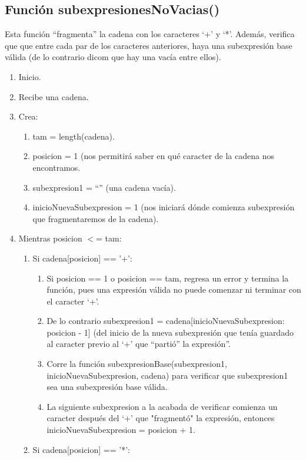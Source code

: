 \documentclass{article}
\begin{document}
\subsection{Función subexpresionesNoVacias()}
\normalsize Esta función “fragmenta” la cadena con los caracteres ‘+’ y ‘*’. Además, verifica que que entre cada par de los caracteres anteriores, haya una subexpresión base válida (de lo contrario dicom que hay una vacía entre ellos).
\begin{enumerate}
    \item Inicio.
    \item Recibe una cadena.
    \item Crea:
    \begin{enumerate}
        \item tam  = length(cadena).
        \item posicion = 1 (nos permitirá saber en qué caracter de la cadena nos encontramos.
        \item subexpresion1 = “” (una cadena vacía).
        \item inicioNuevaSubexpresion = 1 (nos iniciará dónde comienza subexpresión que fragmentaremos de la cadena).
    \end{enumerate}
    \item Mientras posicion $<$= tam:
    \begin{enumerate}
        \item Si cadena[posicion] == '+':
        \begin{enumerate}
            \item Si posicion == 1 o posicion == tam, regresa un error y termina la función, pues una expresión válida no puede comenzar ni terminar con el caracter ‘+’.
            \item De lo contrario subexpresion1 = cadena[inicioNuevaSubexpresion: posicion - 1]  (del inicio de la nueva subexpresión que tenía guardado al caracter previo al ‘+’ que “partió” la expresión”.
            \item Corre la función subexpresionBase(subexpresion1, inicioNuevaSubexpresion, cadena) para verificar que subexpresion1 sea una subexpresión base válida.
            \item La siguiente subexpresion a la acabada de verificar comienza un caracter después del ‘+’ que "fragmentó" la expresión, entonces inicioNuevaSubexpresion = posicion + 1.
        \end{enumerate}
        \item Si cadena[posicion] == '*':
        \begin{enumerate}

\end{enumerate}
\end{enumerate}
\end{enumerate}
\end{document}
